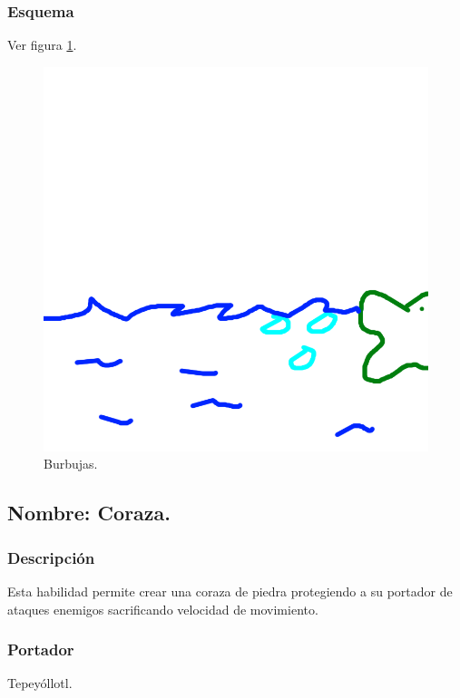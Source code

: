 \documentclass[11pt,letterpaper]{article}
\begin{document}
\subsubsection{Esquema}
			Ver figura \ref{fig:burbujas}.
			\begin{figure}
				\centering
				\includegraphics[height=0.2 \textheight]{Imagenes/burbujas}
				\caption{Burbujas.}
				\label{fig:burbujas}
			\end{figure}
\subsection{Nombre: Coraza.}
\subsubsection{Descripción}
Esta habilidad permite crear una coraza de piedra protegiendo a su portador de ataques enemigos sacrificando velocidad de movimiento.  
\subsubsection{Portador}
Tepeyóllotl.
\end{document}
